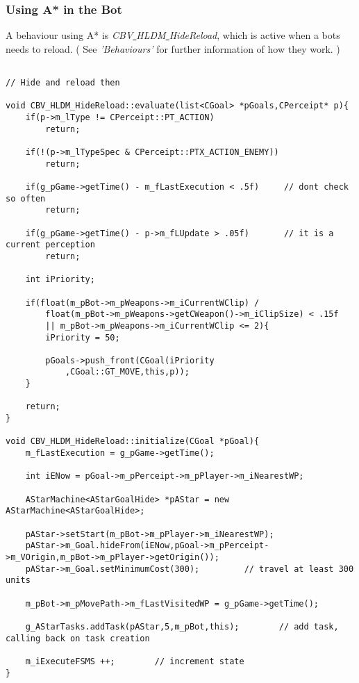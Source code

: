 \documentclass[12pt]{article}
\begin{document}
\subsubsection{Using A* in the Bot}

A behaviour using A* is \textit{CBV\underline{ }HLDM\underline{ }HideReload}, which is active when a bots needs to reload. ( See \textit{'Behaviours'} for further information of how they work. )

\scriptsize
\linespread{1.0}
\begin{verbatim}

// Hide and reload then

void CBV_HLDM_HideReload::evaluate(list<CGoal> *pGoals,CPerceipt* p){
    if(p->m_lType != CPerceipt::PT_ACTION)
        return;

    if(!(p->m_lTypeSpec & CPerceipt::PTX_ACTION_ENEMY))
        return;

    if(g_pGame->getTime() - m_fLastExecution < .5f)		// dont check so often
        return;

    if(g_pGame->getTime() - p->m_fLUpdate > .05f)		// it is a current perception
        return;

    int iPriority;
    
    if(float(m_pBot->m_pWeapons->m_iCurrentWClip) /
        float(m_pBot->m_pWeapons->getCWeapon()->m_iClipSize) < .15f
        || m_pBot->m_pWeapons->m_iCurrentWClip <= 2){
        iPriority = 50;

        pGoals->push_front(CGoal(iPriority
            ,CGoal::GT_MOVE,this,p));
    }

    return;
}

void CBV_HLDM_HideReload::initialize(CGoal *pGoal){
    m_fLastExecution = g_pGame->getTime();

    int iENow = pGoal->m_pPerceipt->m_pPlayer->m_iNearestWP;

    AStarMachine<AStarGoalHide> *pAStar = new AStarMachine<AStarGoalHide>;

    pAStar->setStart(m_pBot->m_pPlayer->m_iNearestWP);
    pAStar->m_Goal.hideFrom(iENow,pGoal->m_pPerceipt->m_VOrigin,m_pBot->m_pPlayer->getOrigin());
    pAStar->m_Goal.setMinimumCost(300);			// travel at least 300 units

    m_pBot->m_pMovePath->m_fLastVisitedWP = g_pGame->getTime();
    
    g_AStarTasks.addTask(pAStar,5,m_pBot,this);        // add task, calling back on task creation
    
    m_iExecuteFSMS ++;        // increment state
}


\end{verbatim}
\end{document}
